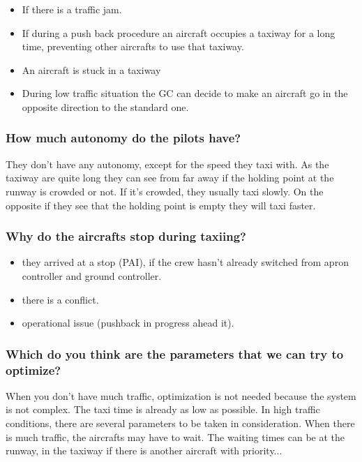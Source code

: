 \documentclass{article}
\begin{document}
\begin{itemize}
	\item If there is a traffic jam.
	\item If during a push back procedure an aircraft occupies a taxiway for a long time, preventing other aircrafts to use that taxiway.
	\item An aircraft is stuck in a taxiway
	\item During low traffic situation the GC can decide to make an aircraft go in the opposite direction to the standard one.
\end{itemize}

\subsubsection*{How much autonomy do the pilots have?}

They don't have any autonomy, except for the speed they taxi with. As the taxiway are quite long they can see from far away if the holding point at the runway is crowded or not. If it's crowded, they usually taxi slowly. On the opposite if they see that the holding point is empty they will taxi faster.

\subsubsection*{Why do the aircrafts stop during taxiing?}

\begin{itemize}
	\item they arrived at a stop (PAI), if the crew hasn't already switched from apron controller and ground controller.
	\item there is a conflict.
	\item operational issue (pushback in progress ahead it).
\end{itemize}


\subsubsection*{Which do you think are the parameters that we can try to optimize?}

When you don't have much traffic, optimization is not needed because the system is not complex. The taxi time is already as low as possible.
In high traffic conditions, there are several parameters to be taken in consideration. When there is much traffic, the aircrafts may have to wait. The waiting times can be at the runway, in the taxiway if there is another aircraft with priority...
\end{document}
